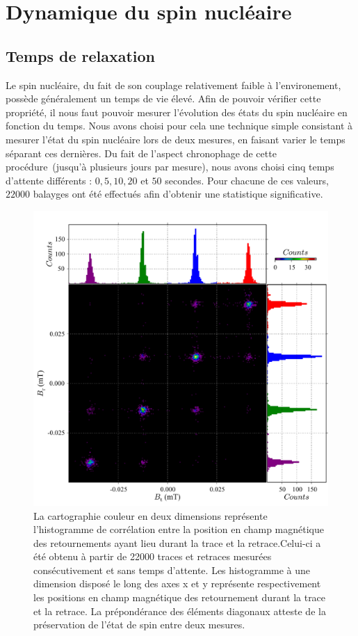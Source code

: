 \section{Dynamique du spin nucléaire}


\subsection{Temps de relaxation}
Le spin nucléaire, du fait de son couplage relativement faible à l'environement, possède généralement un temps de vie élevé. Afin de pouvoir vérifier cette propriété, il nous faut pouvoir mesurer l'évolution des états du spin nucléaire en fonction du temps. Nous avons choisi pour cela une technique simple consistant à mesurer l'état du spin nucléaire lors de deux mesures, en faisant varier le temps séparant ces dernières. Du fait de l'aspect chronophage de cette procédure~(jusqu'à plusieurs jours par mesure), nous avons choisi cinq temps d'attente différents : $0,5,10,20$ et $50$ secondes. Pour chacune de ces valeurs, $22000$ balayges ont été effectués afin d'obtenir une statistique significative.


\begin{figure}
\includegraphics[scale=0.45]{Resultats/Hist2D/Hist2D.pdf} 
\caption{La cartographie couleur en deux dimensions représente l’histogramme de corrélation entre la position en champ magnétique des retournements ayant lieu durant la trace et la retrace.Celui-ci a été obtenu à partir de 22000 traces et retraces mesurées consécutivement et sans temps d'attente. Les histogramme à une dimension disposé le long des axes x et y représente respectivement les positions en champ magnétique des retournement durant la trace et la retrace. La prépondérance des éléments diagonaux atteste de la préservation de l'état de spin entre deux mesures.}
\label{correlations}
\end{figure}

